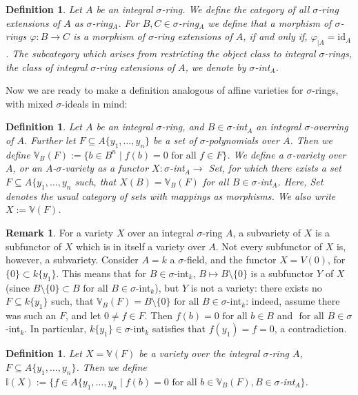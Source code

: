 \documentclass{article}
\def\I{\mathbb{I}}
\def\VV{\mathbb{V}}
\def\s{\sigma}
\def\id{\text{id}}
\def\fa{\text{ for all }}
\theoremstyle{plain}
\newtheorem{defn}[Satz]{Definition}
\theoremstyle{definition}
\newtheorem{rem}[Satz]{Remark}
\begin{document}
\begin{defn}
Let $A$ be an integral $\s$-ring. We define the category of all $\s$-ring extensions of $A$ as $\s$-ring$_A$.
For $B,C \in \s$-ring$_A$ we define that a morphism of $\s$-rings $\varphi: B \rightarrow C$ is a morphism of $\s$-ring extensions of $A$, if and only if, $\varphi_{|A} = \id_A$.
The subcategory which arises from restricting the object class to integral $\s$-rings, the class of integral $\s$-ring extensions of $A$, we denote by $\s$-int$_A$.
\end{defn}

Now we are ready to make a definition analogous of affine varieties for $\s$-rings, with mixed $\s$-ideals in mind:

\begin{defn}
Let $A$ be an integral $\s$-ring, and $B \in \s$-int$_A$ an integral $\s$-overring of $A$. Further let $F \subseteq A\{y_1, \ldots, y_n\}$ be a set of $\s$-polynomials over $A$. 
Then we define $\VV_B(F):= \{ b \in B^n \mid f(b) = 0 \fa f \in F \}$. We define a $\s$-variety over $A$, or an $A$-$\s$-variety as a functor $X: \s$-int$_A \rightarrow$ Set, for which there exists a set $F \subseteq A\{y_1, \ldots, y_n$ such, that $X(B) = \VV_B(F)$ for all $B \in \s$-int$_A$.
Here, Set denotes the usual category of sets with mappings as morphisms. We also write $X := \VV(F)$. \index{$\s$-variety}
\end{defn}

\begin{rem}
For a variety $X$ over an integral $\s$-ring $A$, a subvariety of $X$ is a subfunctor of $X$ which is in itself a variety over $A$. Not every subfunctor of $X$ is, however, a subvariety. Consider $A = k$ a $\s$-field,
and the functor $X = V(0)$, for $\{0\} \subset k\{y_1\}$. This means that for $B \in \s$-int$_k$, $B \mapsto B\setminus \{0\}$ is a subfunctor $Y$ of $X$ (since $B \setminus \{ 0 \} \subset B \fa B \in \s$-int$_k$), but $Y$ is not a variety:
there exists no $F \subseteq k\{y_1\}$ such, that $\VV_B(F) = B \setminus \{ 0 \} \fa B \in \s$-int$_k$: indeed, assume there was such an $F$, and let $0 \neq f \in F$. Then $f(b) = 0 \fa b \in B$ and $\fa B \in \s$-int$_k$. In particular,
$k\{y_1\} \in \s$-int$_k$ satisfies that $f(y_1) = f = 0$, a contradiction. 
\end{rem}

\begin{defn}
Let $X = \VV(F)$ be a variety over the integral $\s$-ring $A$, $F \subseteq A\{y_1,\ldots,y_n\}$. Then we define $\I(X):= \{ f \in A\{y_1,\ldots,y_n \mid f(b) = 0 \fa b \in \VV_B(F), B \in \s$-int$_A \}$.
\end{defn}
\end{document}
